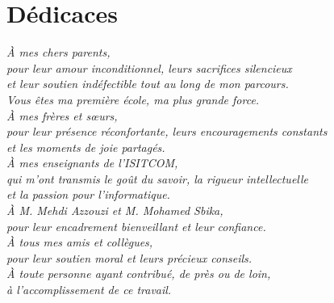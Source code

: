 \chapter*{Dédicaces}
\thispagestyle{empty}

\vspace*{2cm}
\begin{center}
\begin{minipage}{0.85\textwidth}
\centering
\itshape

\textit{À mes chers parents,}\\[0.4cm]
\textit{pour leur amour inconditionnel, leurs sacrifices silencieux}\\
\textit{et leur soutien indéfectible tout au long de mon parcours.}\\
\textit{Vous êtes ma première école, ma plus grande force.}\\[1cm]

\textit{À mes frères et sœurs,}\\[0.4cm]
\textit{pour leur présence réconfortante, leurs encouragements constants}\\
\textit{et les moments de joie partagés.}\\[1cm]

\textit{À mes enseignants de l'ISITCOM,}\\[0.4cm]
\textit{qui m'ont transmis le goût du savoir, la rigueur intellectuelle}\\
\textit{et la passion pour l'informatique.}\\[1cm]

\textit{À M. Mehdi Azzouzi et M. Mohamed Sbika,}\\[0.4cm]
\textit{pour leur encadrement bienveillant et leur confiance.}\\[1cm]

\textit{À tous mes amis et collègues,}\\[0.4cm]
\textit{pour leur soutien moral et leurs précieux conseils.}\\[1cm]

\textit{À toute personne ayant contribué, de près ou de loin,}\\
\textit{à l'accomplissement de ce travail.}

\end{minipage}
\end{center}
\newpage
